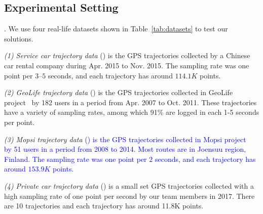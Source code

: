 \subsection{Experimental Setting}

.
We use four real-life datasets shown in Table~\ref{tab:datasets} to test our solutions.


\vspace{0.5ex}
\ni \emph{(1) Service car trajectory data} (\sercar) is the GPS trajectories collected by a Chinese car rental company during Apr. 2015 to Nov. 2015. The sampling rate was one point per $3$--$5$ seconds, and
each trajectory has around $114.1K$ points.

\vspace{0.5ex}
\ni \emph{(2) GeoLife trajectory data} (\geolife) is the GPS trajectories collected in GeoLife project~\cite{Zheng:GeoLife} by 182 users in a period from Apr. 2007 to Oct. 2011. These trajectories have a variety of sampling rates, among which 91\% are logged in each 1-5 seconds per point. %

\vspace{0.5ex}
\ni \emph{(3) Mopsi trajectory data} \textcolor{blue}{(\mopsi) is the GPS trajectories collected in Mopsi project~\cite{Mopsi} by 51 users in a period from 2008 to 2014. Most routes are in Joensuu region, Finland. 
The sampling rate was one point per $2$ seconds, and each trajectory has around $153.9K$ points.}

\vspace{0.5ex}
\ni \emph{(4) Private car trajectory data} (\pricar) is a small set GPS trajectories  collected with a high sampling rate of one point per second by our team members in 2017. There are 10 trajectories and each trajectory has around 11.8K points.





